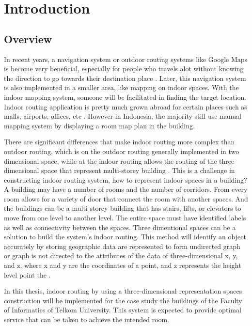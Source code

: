 \chapter{Introduction}
\section{Overview}
In recent years, a navigation system or outdoor routing systems like Google Maps is become very beneficial, especially for people who travels alot without knowing the direction to go towards their destination place \cite{gotlib2012research}. Later, this navigation system is also implemented in a smaller area, like mapping on indoor spaces. With the indoor mapping system, someone will be facilitated in finding the target location\cite{han2014design}. Indoor routing application is pretty much grown abroad for certain places such as malls, airports, offices, etc \cite{afyouni2012spatial}. However in Indonesia, the majority still use manual mapping system by displaying a room map plan in the building.

There are significant differences that make indoor routing more complex than outdoor routing, which is on the outdoor routing generally implemented in two dimensional space, while at the indoor routing allows the routing of the three dimensional space that represent multi-storey building \cite{han2014design}. This is a challenge in constructing indoor routing system, how to represent indoor spaces in a building? A building may have a number of rooms and the number of corridors. From every room allows for a variety of door that connect the room with another spaces. And the buildings can be a multi-storey building that has stairs, lifts, or elevators to move from one level to another level. The entire space must have identified labels as well as connectivity between the spaces. Three dimentional spaces can be a solution to build the system's indoor routing. This method will identify an object accurately by storing geographic data are represented to form undirected graph or graph is not directed to the attributes of the data of three-dimensional x, y, and z, where x and y are the coordinates of a point, and z represents the height level point the \cite{alamri2014adjacency}. 

In this thesis, indoor routing by using a three-dimensional representation spaces construction will be implemented for the case study the buildings of the Faculty of Informatics of Telkom University. This system is expected to provide optimal service that can be taken to achieve the intended room.


